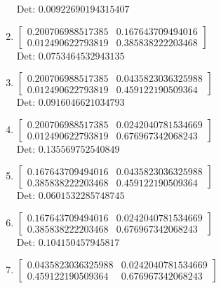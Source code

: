 \documentclass[12pt]{article}
\begin{document}
\begin{enumerate}
Det: $0.00922690194315407$\\

\item $\displaystyle \left[\begin{matrix}0.200706988517385 & 0.167643709494016\\0.012490622793819 & 0.385838222203468\end{matrix}\right]$\\

Det: $0.0753464532943135$\\

\item $\displaystyle \left[\begin{matrix}0.200706988517385 & 0.0435823036325988\\0.012490622793819 & 0.459122190509364\end{matrix}\right]$\\

Det: $0.0916046621034793$\\

\item $\displaystyle \left[\begin{matrix}0.200706988517385 & 0.0242040781534669\\0.012490622793819 & 0.676967342068243\end{matrix}\right]$\\

Det: $0.135569752540849$\\

\item $\displaystyle \left[\begin{matrix}0.167643709494016 & 0.0435823036325988\\0.385838222203468 & 0.459122190509364\end{matrix}\right]$\\

Det: $0.0601532285748745$\\

\item $\displaystyle \left[\begin{matrix}0.167643709494016 & 0.0242040781534669\\0.385838222203468 & 0.676967342068243\end{matrix}\right]$\\

Det: $0.104150457945817$\\

\item $\displaystyle \left[\begin{matrix}0.0435823036325988 & 0.0242040781534669\\0.459122190509364 & 0.676967342068243\end{matrix}\right]$\\


\end{enumerate}
\end{document}
